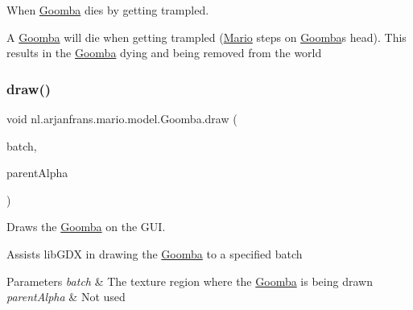 When \hyperlink{classnl_1_1arjanfrans_1_1mario_1_1model_1_1Goomba}{Goomba} dies by getting trampled. 

A \hyperlink{classnl_1_1arjanfrans_1_1mario_1_1model_1_1Goomba}{Goomba} will die when getting trampled (\hyperlink{classnl_1_1arjanfrans_1_1mario_1_1model_1_1Mario}{Mario} steps on \hyperlink{classnl_1_1arjanfrans_1_1mario_1_1model_1_1Goomba}{Goomba}\textquotesingle{}s head). This results in the \hyperlink{classnl_1_1arjanfrans_1_1mario_1_1model_1_1Goomba}{Goomba} dying and being removed from the world \mbox{\label{classnl_1_1arjanfrans_1_1mario_1_1model_1_1Goomba_a36a01fff5535bd6629b4dd03ae452e63}} 
\subsubsection{\texorpdfstring{draw()}{draw()}}
{\footnotesize\ttfamily void nl.\+arjanfrans.\+mario.\+model.\+Goomba.\+draw (\begin{DoxyParamCaption}\item[{Batch}]{batch,  }\item[{float}]{parent\+Alpha }\end{DoxyParamCaption})}



Draws the \hyperlink{classnl_1_1arjanfrans_1_1mario_1_1model_1_1Goomba}{Goomba} on the G\+UI. 

Assists lib\+G\+DX in drawing the \hyperlink{classnl_1_1arjanfrans_1_1mario_1_1model_1_1Goomba}{Goomba} to a specified batch 
\begin{DoxyParams}{Parameters}
{\em batch} & The texture region where the \hyperlink{classnl_1_1arjanfrans_1_1mario_1_1model_1_1Goomba}{Goomba} is being drawn \\
\hline
{\em parent\+Alpha} & Not used \\
\hline
\end{DoxyParams}
\mbox{\label{classnl_1_1arjanfrans_1_1mario_1_1model_1_1Goomba_a6d868ec59ecf46f1562a39ffe521e355}} 
